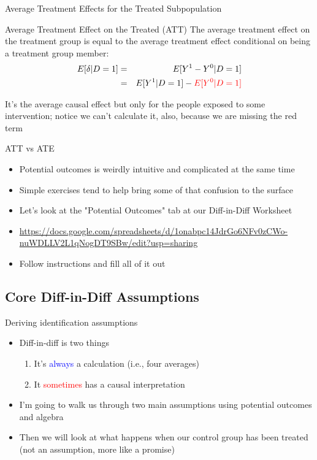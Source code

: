 \documentclass{beamer}
\begin{document}
\begin{frame}{Average Treatment Effects for the Treated Subpopulation}
	\begin{block}{Average Treatment Effect on the Treated (ATT)}
	The average treatment effect on the treatment group is equal to the average treatment effect conditional on being a treatment group member:
		\begin{eqnarray*}
		E[\delta|D=1]&=&E[Y^1-Y^0|D=1] \nonumber \\
		&=&E[Y^1|D=1]-\textcolor{red}{E[Y^0|D=1]}
		\end{eqnarray*}
	\end{block}

	\bigskip

It's the average causal effect but only for the people exposed to some intervention; notice we can't calculate it, also, because we are missing the red term


\end{frame}

\begin{frame}{ATT vs ATE}

\begin{itemize}
\item Potential outcomes is weirdly intuitive and complicated at the same time
\item Simple exercises tend to help bring some of that confusion to the surface
\item Let's look at the "Potential Outcomes" tab at our Diff-in-Diff Worksheet
\item \url{https://docs.google.com/spreadsheets/d/1onabpc14JdrGo6NFv0zCWo-nuWDLLV2L1qNogDT9SBw/edit?usp=sharing}
\item Follow instructions and fill all of it out
\end{itemize}

\end{frame}




\subsection{Core Diff-in-Diff Assumptions}

\begin{frame}{Deriving identification assumptions}

\begin{itemize}

\item Diff-in-diff is two things
	\begin{enumerate}
	\item It's \textcolor{blue}{always} a calculation (i.e., four averages)
	\item It \textcolor{red}{sometimes} has a causal interpretation
	\end{enumerate}
\item I'm going to walk us through two main assumptions using potential outcomes and algebra
\item Then we will look at what happens when our control group has been treated (not an assumption, more like a promise)
\end{itemize}

\end{frame}
\end{document}
